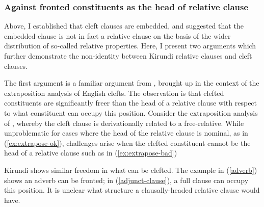 \documentclass[12pt]{article}
\begin{document}
\subsubsection{Against fronted constituents as the head of relative clause} \label{sec:agsint-rc}

Above, I established that cleft clauses are embedded, and suggested that the embedded clause is not in fact a relative clause on the basis of the wider distribution of so-called relative properties. Here, I present two arguments which further demonstrate the non-identity between Kirundi relative clauses and cleft clauses.  

The first argument is a familiar argument from \citet{ekiss-1998}, brought up in the context of the extraposition analysis of English clefts. The observation is that clefted constituents are significantly freer than the head of a relative clause with respect to what constituent can occupy this position. Consider the extraposition analysis of \citet{akmajian-1970}, whereby the cleft clause is derivationally related to a free-relative. While unproblematic for  cases where the head of the relative clause is nominal, as in (\ref{ex:extrapose-ok}), challenges arise when the clefted constituent cannot be the head of a relative clause such as in (\ref{ex:extrapose-bad})

\bex
\ex {} \label{ex:extrapose-ok}\bxl
{}
\fxl
\ex \label{ex:extrapose-bad}\bxl
{}
\fxl
\fex

Kirundi shows similar freedom in what can be clefted. The example in (\ref{adverb}) shows an adverb can be fronted; in (\ref{adjunct-clause}), a full clause can occupy this position. It is unclear what structure a clausally-headed relative clause would have.

\bex
\ex
\bxl
{} \label{adverb}
 \label{adjunct-clause}
\fxl
\fex
\end{document}
